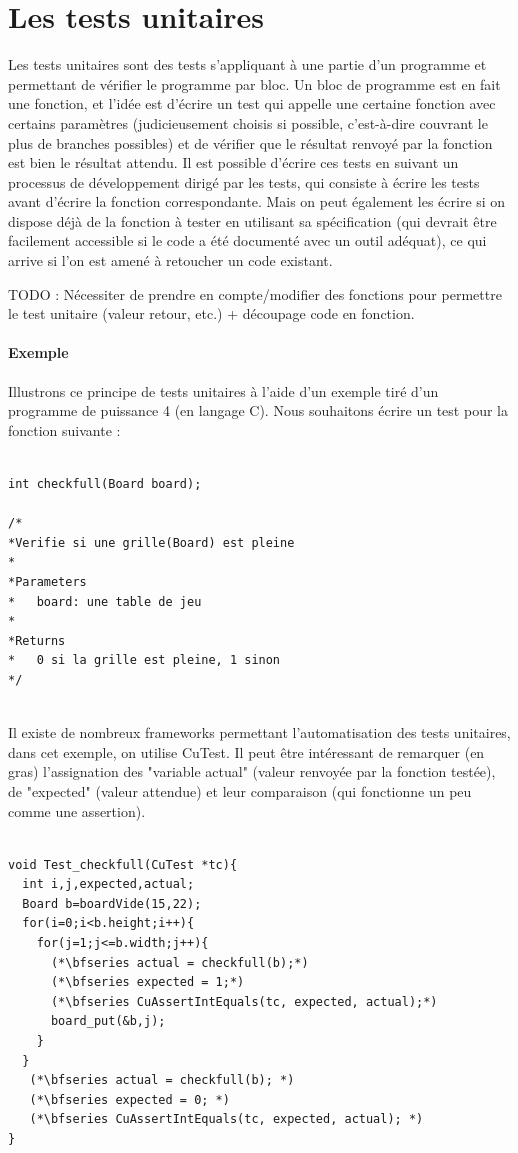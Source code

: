 \documentclass{report}
\begin{document}
\section{Les tests unitaires}
Les tests unitaires sont des tests s'appliquant à une partie d'un programme et permettant de vérifier le programme par bloc. Un bloc de programme est en fait une fonction, et l'idée est d'écrire un test qui appelle une certaine fonction avec certains paramètres (judicieusement choisis si possible, c'est-à-dire couvrant le plus de branches possibles) et de vérifier que le résultat renvoyé par la fonction est bien le résultat attendu. Il est possible d'écrire ces tests en suivant un processus de développement dirigé par les tests, qui consiste à écrire les tests avant d'écrire la fonction correspondante. Mais on peut également les écrire si on dispose déjà de la fonction à tester en utilisant sa spécification (qui devrait être facilement accessible si le code a été documenté avec un outil adéquat), ce qui arrive si l'on est amené à retoucher un code existant.

TODO : Nécessiter de prendre en compte/modifier des fonctions pour permettre le test unitaire (valeur retour, etc.) + découpage code en fonction.
\paragraph{Exemple}
Illustrons ce principe de tests unitaires à l'aide d'un exemple tiré d'un programme de puissance 4 (en langage C). Nous souhaitons écrire un test pour la fonction suivante :

\begin{scriptsize}
\begin{lstlisting}

int checkfull(Board board);

/*
*Verifie si une grille(Board) est pleine
*
*Parameters
*   board: une table de jeu
*
*Returns
*   0 si la grille est pleine, 1 sinon
*/


\end{lstlisting}
\end{scriptsize}

Il existe de nombreux frameworks permettant l'automatisation des tests unitaires, dans cet exemple, on utilise CuTest. Il peut être intéressant de remarquer (en gras) l'assignation des "variable actual" (valeur renvoyée par la fonction testée), de "expected" (valeur attendue) et leur comparaison (qui fonctionne un peu comme une assertion).
\begin{scriptsize}
\begin{lstlisting}

void Test_checkfull(CuTest *tc){
  int i,j,expected,actual;
  Board b=boardVide(15,22);
  for(i=0;i<b.height;i++){
    for(j=1;j<=b.width;j++){
      (*\bfseries actual = checkfull(b);*)
      (*\bfseries expected = 1;*)
      (*\bfseries CuAssertIntEquals(tc, expected, actual);*)
      board_put(&b,j);
    }
  }
   (*\bfseries actual = checkfull(b); *)
   (*\bfseries expected = 0; *)
   (*\bfseries CuAssertIntEquals(tc, expected, actual); *)
}

\end{lstlisting}
\end{scriptsize}
\end{document}
